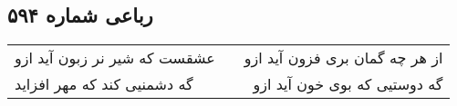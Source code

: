 \begin{center}
\section*{رباعی شماره ۵۹۴}
\label{sec:sh594}
\begin{longtable}{l p{0.5cm} r}
عشقست که شیر نر زبون آید ازو
&&
از هر چه گمان بری فزون آید ازو
\\
گه دشمنیی کند که مهر افزاید
&&
گه دوستیی که بوی خون آید ازو
\\
\end{longtable}
\end{center}
